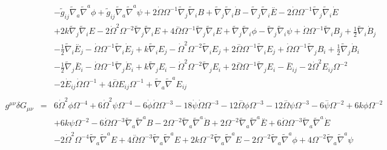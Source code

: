 \documentclass[10pt,letterpaper]{article}
\numberwithin{equation}{section}
\begin{document}
\begin{eqnarray}
&& -  \tilde{g}_{ij} \tilde{\nabla}_{a}\tilde{\nabla}^{a}\phi + \tilde{g}_{ij} \tilde{\nabla}_{a}\tilde{\nabla}^{a}\psi + 2 \dot{\Omega} \Omega^{-1} \tilde{\nabla}_{j}\tilde{\nabla}_{i}B + \tilde{\nabla}_{j}\tilde{\nabla}_{i}\dot{B} -  \tilde{\nabla}_{j}\tilde{\nabla}_{i}\overset{..}{E} - 2 \dot{\Omega} \Omega^{-1} \tilde{\nabla}_{j}\tilde{\nabla}_{i}\dot{E} \nonumber \\ 
&& + 2 k \tilde{\nabla}_{j}\tilde{\nabla}_{i}E - 2 \dot{\Omega}^2 \Omega^{-2} \tilde{\nabla}_{j}\tilde{\nabla}_{i}E + 4 \overset{..}{\Omega} \Omega^{-1} \tilde{\nabla}_{j}\tilde{\nabla}_{i}E + \tilde{\nabla}_{j}\tilde{\nabla}_{i}\phi -  \tilde{\nabla}_{j}\tilde{\nabla}_{i}\psi +\dot{\Omega} \Omega^{-1} \tilde{\nabla}_{i}B_{j} + \tfrac{1}{2} \tilde{\nabla}_{i}\dot{B}_{j} \nonumber \\ 
&& -  \tfrac{1}{2} \tilde{\nabla}_{i}\overset{..}{E}_{j} -  \dot{\Omega} \Omega^{-1} \tilde{\nabla}_{i}\dot{E}_{j} + k \tilde{\nabla}_{i}E_{j} -  \dot{\Omega}^2 \Omega^{-2} \tilde{\nabla}_{i}E_{j} + 2 \overset{..}{\Omega} \Omega^{-1} \tilde{\nabla}_{i}E_{j} + \dot{\Omega} \Omega^{-1} \tilde{\nabla}_{j}B_{i} + \tfrac{1}{2} \tilde{\nabla}_{j}\dot{B}_{i} \nonumber \\ 
&& -  \tfrac{1}{2} \tilde{\nabla}_{j}\overset{..}{E}_{i} -  \dot{\Omega} \Omega^{-1} \tilde{\nabla}_{j}\dot{E}_{i} + k \tilde{\nabla}_{j}E_{i} -  \dot{\Omega}^2 \Omega^{-2} \tilde{\nabla}_{j}E_{i} + 2 \overset{..}{\Omega} \Omega^{-1} \tilde{\nabla}_{j}E_{i}- \overset{..}{E}_{ij} - 2 \dot{\Omega}^2 E_{ij} \Omega^{-2} \nonumber \\ 
&& - 2 \dot{E}_{ij} \dot{\Omega} \Omega^{-1} + 4 \overset{..}{\Omega} E_{ij} \Omega^{-1} + \tilde{\nabla}_{a}\tilde{\nabla}^{a}E_{ij}
\\ \nonumber\\
g^{\mu\nu}\delta G_{\mu\nu} &=& 6 \dot{\Omega}^2 \phi \Omega^{-4} + 6 \dot{\Omega}^2 \psi \Omega^{-4} - 6 \dot{\phi} \dot{\Omega} \Omega^{-3} - 18 \dot{\psi} \dot{\Omega} \Omega^{-3} - 12 \overset{..}{\Omega} \phi \Omega^{-3} - 12 \overset{..}{\Omega} \psi \Omega^{-3} - 6 \overset{..}{\psi} \Omega^{-2} + 6 k \phi \Omega^{-2} \nonumber \\ 
&& + 6 k \psi \Omega^{-2} - 6 \dot{\Omega} \Omega^{-3} \tilde{\nabla}_{a}\tilde{\nabla}^{a}B - 2 \Omega^{-2} \tilde{\nabla}_{a}\tilde{\nabla}^{a}\dot{B} + 2 \Omega^{-2} \tilde{\nabla}_{a}\tilde{\nabla}^{a}\overset{..}{E} + 6 \dot{\Omega} \Omega^{-3} \tilde{\nabla}_{a}\tilde{\nabla}^{a}\dot{E} \nonumber \\ 
&& - 2 \dot{\Omega}^2 \Omega^{-4} \tilde{\nabla}_{a}\tilde{\nabla}^{a}E + 4 \overset{..}{\Omega} \Omega^{-3} \tilde{\nabla}_{a}\tilde{\nabla}^{a}E + 2 k \Omega^{-2} \tilde{\nabla}_{a}\tilde{\nabla}^{a}E - 2 \Omega^{-2} \tilde{\nabla}_{a}\tilde{\nabla}^{a}\phi + 4 \Omega^{-2} \tilde{\nabla}_{a}\tilde{\nabla}^{a}\psi 

\end{eqnarray}
\end{document}

